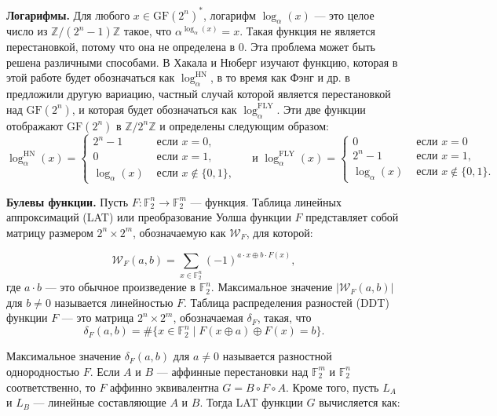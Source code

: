 \textbf{Логарифмы.} Для любого \(x \in \text{GF}(2^n)^*\), логарифм \(\log_\alpha(x)\) — это целое число из \(\mathbb{Z}/(2^n - 1)\mathbb{Z}\) такое, что \(\alpha^{\log_\alpha(x)} = x\). Такая функция не является перестановкой, потому что она не определена в 0. Эта проблема может быть решена различными способами. В \cite{HN10} Хакала и Нюберг изучают функцию, которая в этой работе будет обозначаться как \(\log_{\alpha}^{\text{HN}}\), в то время как Фэнг и др. в \cite{FLY09} предложили другую вариацию, частный случай которой является перестановкой над \(\text{GF}(2^n)\), и которая будет обозначаться как \(\log_{\alpha}^{\text{FLY}}\). Эти две функции отображают \(\text{GF}(2^n)\) в \(\mathbb{Z}/2^n\mathbb{Z}\) и определены следующим образом:
$$
\log _\alpha^{\mathrm{HN}}(x)=\left\{\begin{array}{ll}
        2^n-1 & \text { если } x=0, \\
        0 & \text { если } x=1, \\
        \log _\alpha(x) & \text { если } x \notin\{0,1\},
        \end{array} \quad \text { и } \log _\alpha^{\mathrm{FLY}}(x)= \begin{cases}0 & \text { если } x=0 \\
        2^n-1 & \text { если } x=1, \\
        \log _\alpha(x) & \text { если } x \notin\{0,1\} .\end{cases}\right.
$$

\textbf{Булевы функции.} Пусть \( F : \mathbb{F}_2^n \rightarrow \mathbb{F}_2^m \) — функция. Таблица линейных аппроксимаций (LAT) или преобразование Уолша функции \( F \) представляет собой матрицу размером \( 2^n \times 2^m \), обозначаемую как \( \mathcal{W}_F \), для которой:

\[
\mathcal{W}_F(a, b) = \sum_{x \in \mathbb{F}_2^n} (-1)^{a \cdot x \oplus b \cdot F(x)},
\] где \( a \cdot b \) — это обычное произведение в \(\mathbb{F}_2^n\). Максимальное значение \(|\mathcal{W}_F(a, b)|\) для \(b \neq 0\) называется линейностью \( F \). Таблица распределения разностей (DDT) функции \( F \) — это матрица \( 2^n \times 2^m \), обозначаемая \(\delta_F\), такая, что
\[
\delta_F(a, b) = \# \{ x \in \mathbb{F}_2^n \mid F(x \oplus a) \oplus F(x) = b \}.
\]

Максимальное значение \(\delta_F(a, b)\) для \(a \neq 0\) называется разностной однородностью \( F \). Если \( A \) и \( B \) — аффинные перестановки над \(\mathbb{F}_2^m\) и \(\mathbb{F}_2^n\) соответственно, то \( F \) аффинно эквивалентна \( G = B \circ F \circ A \). Кроме того, пусть \( L_A \) и \( L_B \) — линейные составляющие \( A \) и \( B \). Тогда LAT функции \( G \) вычисляется как:

